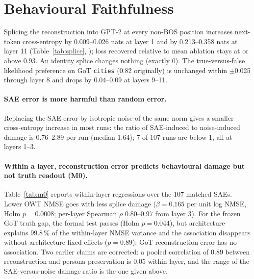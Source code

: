 \section{Behavioural Faithfulness}\label{sec:behaviour}

Splicing the reconstruction into GPT-2 at every non-BOS position increases next-token cross-entropy by 0.009--0.026
nats at layer 1 and by 0.213--0.358 nats at layer 11 (Table~\ref{tab:splice}, ); loss recovered
relative to mean ablation stays at or above 0.93. An identity splice changes nothing (exactly 0). The true-versus-false
likelihood preference on GoT \texttt{cities} (0.82 originally) is unchanged within $\pm$0.025 through layer 8 and drops
by 0.04--0.09 at layers 9--11.

\paragraph{SAE error is more harmful than random error.} Replacing the SAE error by isotropic noise of the same norm
gives a smaller cross-entropy increase in most runs: the ratio of SAE-induced to noise-induced damage is 0.76--2.89
per run (median 1.64); 7 of 107 runs are below 1, all at layers 1--3.

\paragraph{Within a layer, reconstruction error predicts behavioural damage but not truth readout (M0).}
Table~\ref{tab:m0} reports within-layer regressions over the 107 matched SAEs. Lower OWT NMSE goes with less splice
damage ($\beta=0.165$ per unit log NMSE, Holm $p=0.0008$; per-layer Spearman $\rho$ 0.80--0.97 from layer 3). For the
frozen GoT truth gap, the formal test passes (Holm $p=0.044$), but architecture explains 99.8\,\% of the within-layer
NMSE variance and the association disappears without architecture fixed effects ($p=0.89$); GoT reconstruction error
has no association. Two earlier claims are corrected: a pooled correlation of 0.89 between reconstruction and persona
preservation is 0.05 within layer, and the range of the SAE-versus-noise damage ratio is the one given above.



